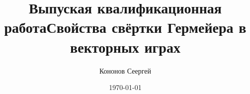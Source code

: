\title{Выпуская квалификационная работа}
\title{Свойства свёртки Гермейера в векторных играх }
\author{Кононов Сеергей}
\date{\today}
\maketitle

\clearpage
\tableofcontents
\clearpage